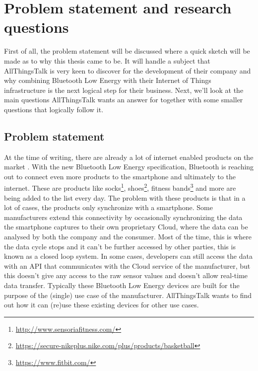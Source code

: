 \documentclass[pdftex,a4paper,12pt,twoside]{report}
\begin{document}
\newpage{}
\section{Problem statement and research questions}
\label{sec:problemdefinition}
First of all, the problem statement will be discussed where a quick sketch will be made as to why this thesis came to be. It will handle a subject that AllThingsTalk is very keen to discover for the development of their company and why combining Bluetooth Low Energy with their Internet of Things infrastructure is the next logical step for their business. Next, we'll look at the main questions AllThingsTalk wants an answer for together with some smaller questions that logically follow it.

\subsection{Problem statement}
\label{subsec:problemstatement}
At the time of writing, there are already a lot of internet enabled products on the market \citep{gartner2015}. With the new Bluetooth Low Energy specification, Bluetooth is reaching out to connect even more products to the smartphone and ultimately to the internet. These are products like socks\footnote{\url{http://www.sensoriafitness.com/}}, shoes\footnote{\url{https://secure-nikeplus.nike.com/plus/products/basketball}}, fitness bands\footnote{\url{https://www.fitbit.com/}} and more are being added to the list every day. The problem with these products is that in a lot of cases, the products only synchronize with a smartphone. Some manufacturers extend this connectivity by occasionally synchronizing the data the smartphone captures to their own proprietary Cloud, where the data can be analysed by both the company and the consumer. Most of the time, this is where the data cycle stops and it can't be further accessed by other parties, this is known as a closed loop system. In some cases, developers can still access the data with an API that communicates with the Cloud service of the manufacturer, but this doesn't give any access to the raw sensor values and doesn't allow real-time data transfer. Typically these Bluetooth Low Energy devices are built for the purpose of the (single) use case of the manufacturer. AllThingsTalk wants to find out how it can (re)use these existing devices for other use cases.
\end{document}
